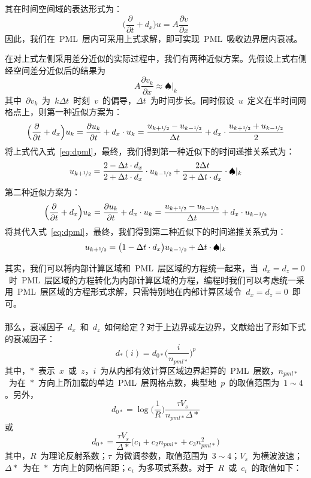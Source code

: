 \documentclass[UTF8]{ctexart}
\renewcommand{\cite}[1]{\textsuperscript{\textsuperscript{\citeleft\citen{#1}\citeright}}}          %
\begin{document}
其在时间空间域的表达形式为：
\begin{equation}\label{eq:dpml}
\Big(\frac{\partial}{\partial t}+d_x\Big)u=A\frac{\partial v}{\partial x}
\end{equation}
因此，我们在~PML~层内可采用上式求解，即可实现~PML~吸收边界层内衰减。\par
在对上式左侧采用差分近似的实际过程中，我们有两种近似方案。先假设上式右侧经空间差分近似后的结果为
\[ A\dfrac{\partial v_k}{\partial x}\approx\spadesuit|_k \]
其中~$\partial v_k$~为~$k\Delta t$~时刻~$v$~的偏导，$\Delta t$~为时间步长。同时假设~$u$~定义在半时间网格点上，则第一种近似方案为：
\[ \Big(\frac{\partial}{\partial t}+d_x\Big)u_k=\frac{\partial u_k}{\partial t}+d_x\cdot u_k=\frac{u_{k+\nicefrac{1}{2}}-u_{k-\nicefrac{1}{2}}}{\Delta t}+d_x\cdot\frac{u_{k+\nicefrac{1}{2}}+u_{k-\nicefrac{1}{2}}}{2} \]
将上式代入式~\eqref{eq:dpml}，最终，我们得到第一种近似下的时间递推关系式为：
\begin{equation}\label{eq:pml1}
u_{k+\nicefrac{1}{2}}=\frac{2-\Delta t\cdot d_x}{2+\Delta t\cdot d_x}\cdot u_{k-\nicefrac{1}{2}}+\frac{2\Delta t}{2+\Delta t\cdot d_x}\cdot\spadesuit|_k
\end{equation}
第二种近似方案为：
\[ \Big(\frac{\partial}{\partial t}+d_x\Big)u_k=\frac{\partial u_k}{\partial t}+d_x\cdot u_k=\frac{u_{k+\nicefrac{1}{2}}-u_{k-\nicefrac{1}{2}}}{\Delta t}+d_x\cdot u_{k-\nicefrac{1}{2}} \]
将其代入式~\eqref{eq:dpml}，最终，我们得到第二种近似下的时间递推关系式为：
\begin{equation}\label{eq:pml2}
u_{k+\nicefrac{1}{2}}=\big(1-\Delta t\cdot d_x\big)u_{k-\nicefrac{1}{2}}+\Delta t\cdot\spadesuit|_k
\end{equation}\par
其实，我们可以将内部计算区域和~PML~层区域的方程统一起来，当~$d_x=d_z=0$~时~PML~层区域的方程转化为内部计算区域的方程，编程时我们可以考虑统一采用~PML~层区域的方程形式求解，只需特别地在内部计算区域令~$d_x=d_z=0$~即可。\par
那么，衰减因子~$d_x$~和~$d_z$~如何给定？对于上边界或左边界，文献\cite{Marcinkovich_2003}给出了形如下式的衰减因子：
\[ d_*(i)=d_{0*}\Big(\frac{i}{n_{pml*}}\Big)^p \]
其中，$*$~表示~$x$~或~$z$，$i$~为从内部有效计算区域边界起算的~PML~层数，$n_{pml*}$~为在~$*$~方向上所加载的单边~PML~层网格点数，典型地~$p$~的取值范围为~$1\sim4$。另外，
\[ d_{0*}=\log\Big(\frac{1}{R}\Big)\frac{\tau V_s}{n_{pml*}\Delta *} \]
或
\[ d_{0*}=\frac{\tau V_s}{\Delta *}\big(c_1+c_2 n_{pml*}+c_3 n_{pml*}^2\big) \]
其中，$R$~为理论反射系数；$\tau$~为微调参数，取值范围为~$3\sim4$；$V_s$~为横波波速；$\Delta *$~为在~$*$~方向上的网格间距；$c_i$~为多项式系数。对于~$R$~或~$c_i$~的取值如下：
\end{document}
